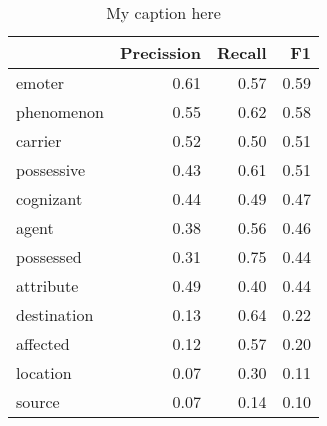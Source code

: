 \begin{table}[!ht]
\centering
\begin{tabular}{lrrr}
\toprule
{} &  Precission &  Recall &   F1 \\
\midrule
emoter      &        0.61 &    0.57 & 0.59 \\
phenomenon  &        0.55 &    0.62 & 0.58 \\
carrier     &        0.52 &    0.50 & 0.51 \\
possessive  &        0.43 &    0.61 & 0.51 \\
cognizant   &        0.44 &    0.49 & 0.47 \\
agent       &        0.38 &    0.56 & 0.46 \\
possessed   &        0.31 &    0.75 & 0.44 \\
attribute   &        0.49 &    0.40 & 0.44 \\
destination &        0.13 &    0.64 & 0.22 \\
affected    &        0.12 &    0.57 & 0.20 \\
location    &        0.07 &    0.30 & 0.11 \\
source      &        0.07 &    0.14 & 0.10 \\
\bottomrule
\end{tabular}
\caption{My caption here}
\label{tab:PARTICIPANT_ROLE_MOST_USED-oe-combined-F1}
\end{table}